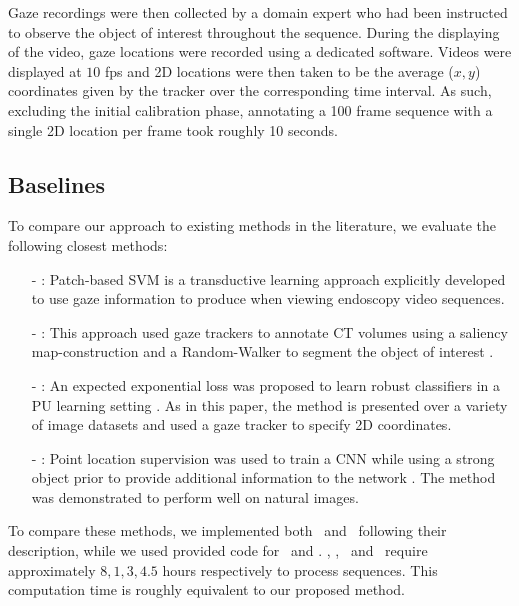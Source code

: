 Gaze recordings were then collected by a domain expert who had been instructed to observe the object of interest throughout the sequence. During the displaying of the video, gaze locations were recorded using a dedicated software. Videos were displayed at $10$ fps and 2D locations were then taken to be the average ($x,y$) coordinates given by the tracker over the corresponding time interval. As such, excluding the initial calibration phase, annotating a 100 frame sequence with a single 2D location per frame took roughly 10 seconds. 

\subsection{Baselines}
To compare our approach to existing methods in the literature, we evaluate the following closest methods:

\begin{itemize}
\item[-]{\PSVM :} Patch-based SVM
is a transductive learning approach \cite{vilarino07} explicitly developed to use gaze information to produce  when viewing endoscopy video sequences.

\item[-]{\GS :} This approach used gaze trackers to annotate CT volumes using a saliency map-construction and a Random-Walker to segment the object of interest \cite{khosravan16}.

\item[-]{\EEL :} An expected exponential loss was proposed to learn robust classifiers in a PU learning setting \cite{lejeune17}. As in this paper, the method is presented over a variety of image datasets and used a gaze tracker to specify 2D coordinates.

\item[-]{\DL :} Point location supervision was used to train a CNN while using a strong object prior to provide additional information to the network \cite{bearman16}. The method was demonstrated to perform well on natural images.
\end{itemize}

To compare these methods, we implemented both \PSVM ~and \GS ~following their description, while we used provided code for \EEL ~and \DL . \PSVM, \GS, \EEL ~and \DL ~require approximately $8, 1, 3, 4.5$ hours respectively to process sequences. This computation time is roughly equivalent to our proposed method.

